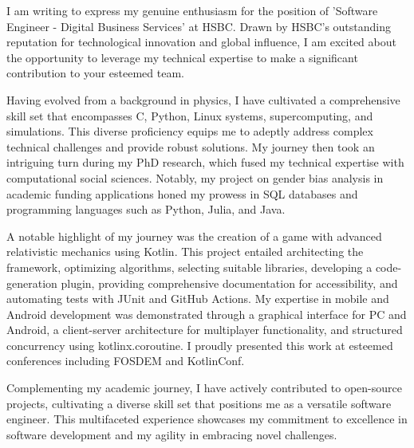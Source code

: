 \documentclass[11pt, a4paper]{awesome-cv}
\begin{document}
\makecvheader[R]

\makecvfooter
  {}%
  {}%
  {}

\makelettertitle

\begin{cvletter}

I am writing to express my genuine enthusiasm for the position of 'Software Engineer - Digital Business Services' at HSBC. Drawn by HSBC's outstanding reputation for technological innovation and global influence, I am excited about the opportunity to leverage my technical expertise to make a significant contribution to your esteemed team.

Having evolved from a background in physics, I have cultivated a comprehensive skill set that encompasses C, Python, Linux systems, supercomputing, and simulations. This diverse proficiency equips me to adeptly address complex technical challenges and provide robust solutions. My journey then took an intriguing turn during my PhD research, which fused my technical expertise with computational social sciences. Notably, my project on gender bias analysis in academic funding applications honed my prowess in SQL databases and programming languages such as Python, Julia, and Java.

A notable highlight of my journey was the creation of a game with advanced relativistic mechanics using Kotlin. This project entailed architecting the framework, optimizing algorithms, selecting suitable libraries, developing a code-generation plugin, providing comprehensive documentation for accessibility, and automating tests with JUnit and GitHub Actions. My expertise in mobile and Android development was demonstrated through a graphical interface for PC and Android, a client-server architecture for multiplayer functionality, and structured concurrency using kotlinx.coroutine. I proudly presented this work at esteemed conferences including FOSDEM and KotlinConf.

Complementing my academic journey, I have actively contributed to open-source projects, cultivating a diverse skill set that positions me as a versatile software engineer. This multifaceted experience showcases my commitment to excellence in software development and my agility in embracing novel challenges.


\end{cvletter}
\end{document}
